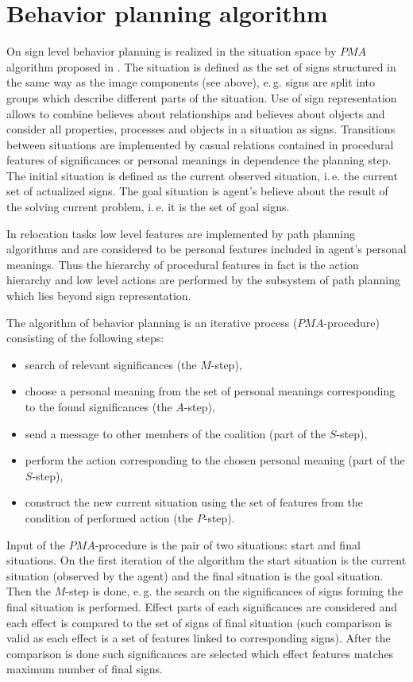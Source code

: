 \documentclass[runningheads,a4paper]{llncs}
\begin{document}
\section{Behavior planning algorithm}\label{behavior}

On sign level behavior planning is realized in the situation space by $PMA$ algorithm proposed in \cite{Osipov2015}. The situation is defined as the set of signs structured in the same way as the image components (see above), e.\,g. signs are split into groups which describe different parts of the situation. Use of sign representation allows to combine believes about relationships and believes about objects and consider all properties, processes and objects in a situation as signs. Transitions between situations are implemented by casual relations contained in procedural features of significances or personal meanings in dependence the planning step. The initial situation is defined as the current observed situation, i.\,e. the current set of actualized signs. The goal situation is agent's believe about the result of the solving current problem, i.\,e. it is the set of goal signs.

In relocation tasks low level features are implemented by path planning algorithms and are considered to be personal features included in agent's personal meanings. Thus the hierarchy of procedural features in fact is the action hierarchy and low level actions are performed by the subsystem of path planning which lies beyond sign representation.

The algorithm of behavior planning is an iterative process ($PMA$-procedure) consisting of the following steps:
\begin{itemize}
	\item search of relevant significances (the $M$-step), 
	\item choose a personal meaning from the set of personal meanings corresponding to the found significances (the $A$-step), 
	\item send a message to other members of the coalition (part of the $S$-step),
	\item perform the action corresponding to the chosen personal meaning (part of the $S$-step),
	\item construct the new current situation using the set of features from the condition of performed action (the $P$-step).
\end{itemize}

Input of the $PMA$-procedure is the pair of two situations: start and final situations. On the first iteration of the algorithm the start situation is the current situation (observed by the agent) and the final situation is the goal situation. Then the $M$-step is done, e.\,g. the search on the significances of signs forming the final situation is performed. Effect parts of each significances are considered and each effect is compared to the set of signs of final situation (such comparison is valid as each effect is a set of features linked to corresponding signs). After the comparison is done such significances are selected which effect features matches maximum number of final signs.
\end{document}
